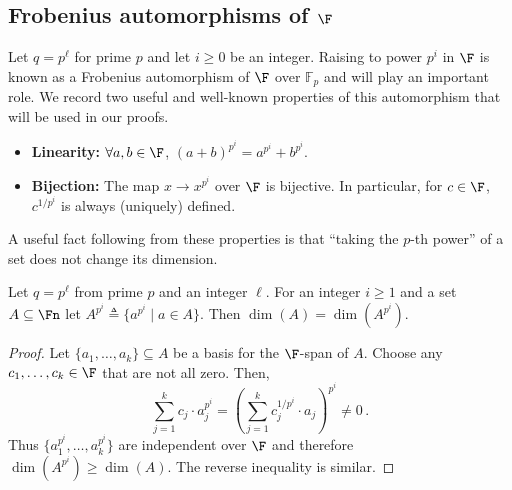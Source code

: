 \subsection{Frobenius automorphisms of \texorpdfstring{$\F$}{F}}\label{subsec:frobenius}
Let $q=p^{\ell}$ for prime $p$ and let $i\geq 0$ be an integer.
Raising to power $p^i$ in $\F$ is known as a Frobenius automorphism of $\F$ over $\mathbb{F}_p$ and will play an important role. We record two useful and well-known properties of this automorphism that will be used in our proofs.
\begin{itemize}
\item{\bf Linearity:} $\forall a,b \in \F$, $(a+b)^{p^i} = a^{p^i} + b^{p^i}$.
\item{\bf Bijection:} The map $x\to x^{p^i}$ over $\F$ is bijective. In particular,
for $c\in \F$, $c^{1/p^i}$ is always (uniquely) defined.
\end{itemize}

A useful fact following from these properties is that ``taking the
%
$p$-th
power'' of a set does not change its dimension.
\begin{claim}\label{claim-frobenius_has_dim}
Let $q=p^{\ell}$ from prime $p$ and an integer $\ell$.
For an integer $i\geq 1$ and a set $A\subseteq\Fn$
let $A^{p^i}\triangleq \{a^{p^i}\mid a\in A\}$.
Then $\dim(A)=\dim(A^{p^i})$.
\end{claim}
\begin{proof}
Let $\{a_1,\ldots, a_k\}\subseteq A$ be a basis for the $\F$-span of $A$.
Choose any $c_1,\ldots,c_k\in \F$ that are not all zero.
 Then,
\[\sum_{j=1}^k c_j \cdot a_j^{p^i} = \left(\sum_{j=1}^k c_j^{1/p^i} \cdot a_j\right)^{p^i}\neq 0\,.\]
Thus $\{a_1^{p^i},\ldots, a_k^{p^i}\}$ are independent over $\F$ and therefore $\dim(A^{p^i})\geq \dim(A)$.
The reverse inequality is similar.
\end{proof}


